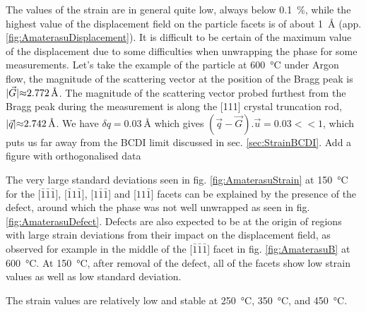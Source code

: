 The values of the strain are in general quite low, always below \qty{0.1}{\percent}, while the highest value of the displacement field on the particle facets is of about \qty{1}{\angstrom} (app. \ref{fig:AmaterasuDisplacement}).
It is difficult to be certain of the maximum value of the displacement due to some difficulties when unwrapping the phase for some measurements.
Let's take the example of the particle at \qty{600}{\degreeCelsius} under Argon flow, the magnitude of the scattering vector at the position of the Bragg peak is $|\vec{G}| \qty{\approx 2.772}{\angstrom}$.
The magnitude of the scattering vector probed furthest from the Bragg peak during the measurement is along the [111] crystal truncation rod, $|\vec{q}| \qty{\approx 2.742}{\angstrom}$.
We have $\delta q = \qty{0.03}{\angstrom}$ which gives $(\vec{q}-\vec{G}).\vec{u} = 0.03 <<1$, which puts us far away from the BCDI limit discussed in sec. \ref{sec:StrainBCDI}.
\textcolor{Important}{Add a figure with orthogonalised data}

The very large standard deviations seen in fig. \ref{fig:AmaterasuStrain} at \qty{150}{\degreeCelsius} for the [$\bar{1}\bar{1}\bar{1}$], [$\bar{1}1\bar{1}$], [$1\bar{1}\bar{1}$] and [$11\bar{1}$] facets can be explained by the presence of the defect, around which the phase was not well unwrapped as seen in fig. \ref{fig:AmaterasuDefect}.
Defects are also expected to be at the origin of regions with large strain deviations from their impact on the displacement field, as observed for example in the middle of the [$\bar{1}\bar{1}\bar{1}$] facet in fig. \ref{fig:AmaterasuB} at \qty{600}{\degreeCelsius}.
At \qty{150}{\degreeCelsius}, after removal of the defect, all of the facets show low strain values as well as low standard deviation.

The strain values are relatively low and stable at \qty{250}{\degreeCelsius}, \qty{350}{\degreeCelsius}, and \qty{450}{\degreeCelsius}.


